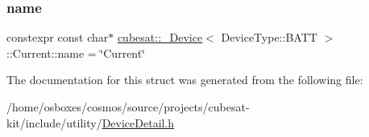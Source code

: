 \subsubsection{\texorpdfstring{name}{name}}
{\footnotesize\ttfamily constexpr const char$\ast$ \hyperlink{structcubesat_1_1__Device}{cubesat\+::\+\_\+\+Device}$<$ Device\+Type\+::\+B\+A\+TT $>$\+::Current\+::name = \char`\"{}Current\char`\"{}\hspace{0.3cm}{\ttfamily [static]}}



The documentation for this struct was generated from the following file\+:\begin{DoxyCompactItemize}
\item 
/home/osboxes/cosmos/source/projects/cubesat-\/kit/include/utility/\hyperlink{DeviceDetail_8h}{Device\+Detail.\+h}\end{DoxyCompactItemize}
